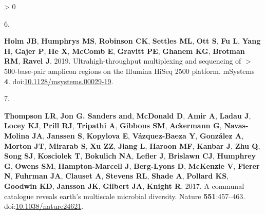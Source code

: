 \documentclass[
]{article}
\newlength{\cslhangindent}
\newlength{\csllabelwidth}
\newenvironment{CSLReferences}[3] %
 {%
  \setlength{\parindent}{0pt}
  \ifodd #1 \everypar{\setlength{\hangindent}{\cslhangindent}}\ignorespaces\fi
  \ifnum #2 > 0
  \setlength{\parskip}{#2\baselineskip}
  \fi
 }%
 {}
\newcommand{\CSLLeftMargin}[1]{\parbox[t]{\csllabelwidth}{#1}}
\newcommand{\CSLRightInline}[1]{\parbox[t]{\linewidth - \csllabelwidth}{#1}}
\begin{document}
\begin{CSLReferences}{0}{0}
\leavevmode\hypertarget{ref-Holm2019}{}%
\CSLLeftMargin{6. }
\CSLRightInline{\textbf{Holm JB}, \textbf{Humphrys MS}, \textbf{Robinson
CK}, \textbf{Settles ML}, \textbf{Ott S}, \textbf{Fu L}, \textbf{Yang
H}, \textbf{Gajer P}, \textbf{He X}, \textbf{McComb E}, \textbf{Gravitt
PE}, \textbf{Ghanem KG}, \textbf{Brotman RM}, \textbf{Ravel J}. 2019.
Ultrahigh-throughput multiplexing and sequencing of \(>\)500-base-pair
amplicon regions on the {Illumina} {HiSeq} 2500 platform. {mSystems}
\textbf{4}.
doi:\href{https://doi.org/10.1128/msystems.00029-19}{10.1128/msystems.00029-19}.}

\leavevmode\hypertarget{ref-Thompson2017}{}%
\CSLLeftMargin{7. }
\CSLRightInline{\textbf{Thompson LR}, \textbf{Jon G. Sanders and},
\textbf{McDonald D}, \textbf{Amir A}, \textbf{Ladau J}, \textbf{Locey
KJ}, \textbf{Prill RJ}, \textbf{Tripathi A}, \textbf{Gibbons SM},
\textbf{Ackermann G}, \textbf{Navas-Molina JA}, \textbf{Janssen S},
\textbf{Kopylova E}, \textbf{Vázquez-Baeza Y}, \textbf{González A},
\textbf{Morton JT}, \textbf{Mirarab S}, \textbf{Xu ZZ}, \textbf{Jiang
L}, \textbf{Haroon MF}, \textbf{Kanbar J}, \textbf{Zhu Q}, \textbf{Song
SJ}, \textbf{Kosciolek T}, \textbf{Bokulich NA}, \textbf{Lefler J},
\textbf{Brislawn CJ}, \textbf{Humphrey G}, \textbf{Owens SM},
\textbf{Hampton-Marcell J}, \textbf{Berg-Lyons D}, \textbf{McKenzie V},
\textbf{Fierer N}, \textbf{Fuhrman JA}, \textbf{Clauset A},
\textbf{Stevens RL}, \textbf{Shade A}, \textbf{Pollard KS},
\textbf{Goodwin KD}, \textbf{Jansson JK}, \textbf{Gilbert JA},
\textbf{Knight R}. 2017. A communal catalogue reveals earth's multiscale
microbial diversity. Nature \textbf{551}:457--463.
doi:\href{https://doi.org/10.1038/nature24621}{10.1038/nature24621}.}


\end{CSLReferences}
\end{document}
